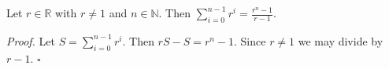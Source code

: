 Let $r \in \mathbb{R}$ with $r \neq 1$ and $n \in \mathbb{N}$.
Then $\sum_{i=0}^{n - 1} r^{i} = \frac{r^{n} - 1}{r - 1}$.

\textit{Proof.} Let $S = \sum_{i=0}^{n - 1} r^{i}$.
Then $rS - S = r^{n} - 1$.
Since $r \neq 1$ we may divide by $r - 1$. \hfill$\square$